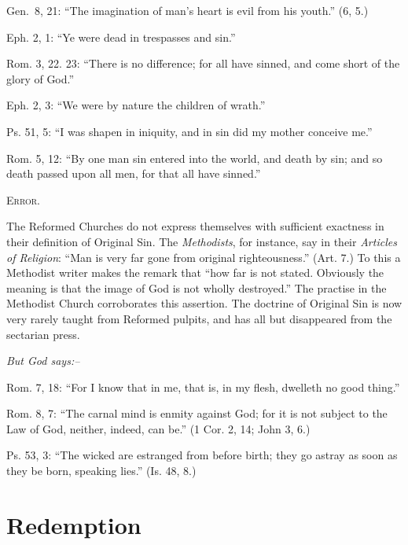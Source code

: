 \documentclass[
]{book}
\begin{document}
Gen.~8, 21: ``The imagination of man's heart is evil from his youth.'' (6, 5.)

Eph. 2, 1: ``Ye were dead in trespasses and sin.''

Rom. 3, 22. 23: ``There is no difference; for all have sinned, and come short of the glory of God.''

Eph. 2, 3: ``We were by nature the children of wrath.''

Ps. 51, 5: ``I was shapen in iniquity, and in sin did my mother conceive me.''

Rom. 5, 12: ``By one man sin entered into the world, and death by sin; and so death passed upon all men, for that all have sinned.''

\begin{center}
\textsc{Error.}
\end{center}

The Reformed Churches do not express themselves with sufficient exactness in their definition of Original Sin. The \emph{Methodists}, for instance, say in their \emph{Articles of Religion}: ``Man is very far gone from original righteousness.'' (Art. 7.) To this a Methodist writer makes the remark that ``how far is not stated. Obviously the meaning is that the image of God is not wholly destroyed.'' The practise in the Methodist Church corroborates this assertion. The doctrine of Original Sin is now very rarely taught from Reformed pulpits, and has all but disappeared from the sectarian press.

\begin{center}
\textsl{But God says:--}
\end{center}

Rom. 7, 18: ``For I know that in me, that is, in my flesh, dwelleth no good thing.''

Rom. 8, 7: ``The carnal mind is enmity against God; for it is not subject to the Law of God, neither, indeed, can be.'' (1 Cor. 2, 14; John 3, 6.)

Ps. 53, 3: ``The wicked are estranged from before birth; they go astray as soon as they be born, speaking lies.'' (Is. 48, 8.)

\hypertarget{redemption}{%
\section*{\texorpdfstring{Redemption}{Redemption}}\label{redemption}}
\end{document}
